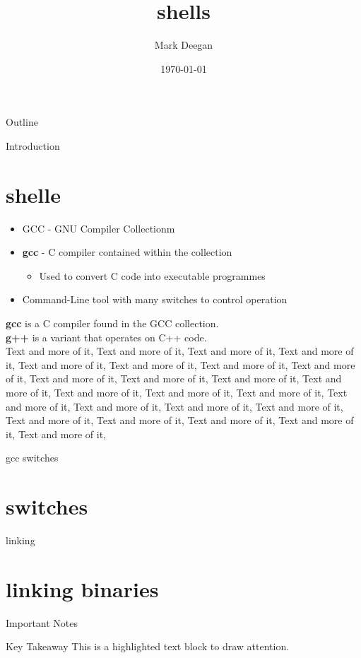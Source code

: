 \documentclass{beamer}
\title{\textbf{shells}}
\author{Mark Deegan}
\institute{TU Dublin}
\date{\today}
\begin{document}
\begin{frame}
    \maketitle
\end{frame}

\begin{frame}{Outline}
    \tableofcontents
\end{frame}

\begin{frame}[allowframebreaks]{Introduction}
    \section{shelle}
    \begin{itemize}
        \item GCC - GNU Compiler Collectionm
        \item \textbf{gcc} - C compiler contained within the collection
        \begin{itemize}
            \item Used to convert C code into executable programmes
        \end{itemize}
        \item Command-Line tool with many switches to control operation
    \end{itemize}
    \textbf{gcc} is a C compiler found in the GCC collection.
    \\
    \textbf{g++} is a variant that operates on C++ code.
    \\
    \framebreak
    Text and more of it, Text and more of it, Text and more of it, Text and more of it, Text and more of it, Text and more of it, Text and more of it, Text and more of it, Text and more of it, Text and more of it, Text and more of it, Text and more of it, Text and more of it, \framebreak
    Text and more of it, Text and more of it, Text and more of it, Text and more of it, Text and more of it, Text and more of it, Text and more of it, Text and more of it, Text and more of it, Text and more of it, Text and more of it, 
\end{frame}

\begin{frame}[allowframebreaks]{gcc switches}
    \section{switches}
\end{frame}

\begin{frame}[allowframebreaks]{linking}
    \section{linking binaries}
\end{frame}

\begin{frame}{Important Notes}
    \begin{block}{Key Takeaway}
        This is a highlighted text block to draw attention.
    \end{block}
\end{frame}
\end{document}
